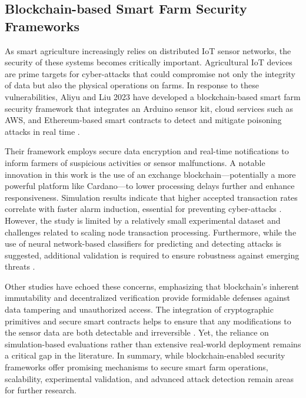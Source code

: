\documentclass[12pt,onecolumn]{IEEEtran} %
\begin{document}
\subsection*{Blockchain-based Smart Farm Security Frameworks}

As smart agriculture increasingly relies on distributed IoT sensor networks, the security of these systems becomes critically important. Agricultural IoT devices are prime targets for cyber-attacks that could compromise not only the integrity of data but also the physical operations on farms. In response to these vulnerabilities, Aliyu and Liu 2023 have developed a blockchain-based smart farm security framework that integrates an Arduino sensor kit, cloud services such as AWS, and Ethereum-based smart contracts to detect and mitigate poisoning attacks in real time \cite{aliyu2023blockchainbasedsmartfarm}.

Their framework employs secure data encryption and real-time notifications to inform farmers of suspicious activities or sensor malfunctions. A notable innovation in this work is the use of an exchange blockchain---potentially a more powerful platform like Cardano---to lower processing delays further and enhance responsiveness. Simulation results indicate that higher accepted transaction rates correlate with faster alarm induction, essential for preventing cyber-attacks \cite{aliyu2023blockchainbasedsmartfarm}. However, the study is limited by a relatively small experimental dataset and challenges related to scaling node transaction processing. Furthermore, while the use of neural network-based classifiers for predicting and detecting attacks is suggested, additional validation is required to ensure robustness against emerging threats \cite{aliyu2023blockchainbasedsmartfarm}.

Other studies have echoed these concerns, emphasizing that blockchain's inherent immutability and decentralized verification provide formidable defenses against data tampering and unauthorized access. The integration of cryptographic primitives and secure smart contracts helps to ensure that any modifications to the sensor data are both detectable and irreversible \cite{aliyu2023blockchainbasedsmartfarm, demestichas2020blockchaininagriculture}. Yet, the reliance on simulation-based evaluations rather than extensive real-world deployment remains a critical gap in the literature. In summary, while blockchain-enabled security frameworks offer promising mechanisms to secure smart farm operations, scalability, experimental validation, and advanced attack detection remain areas for further research.
\end{document}
